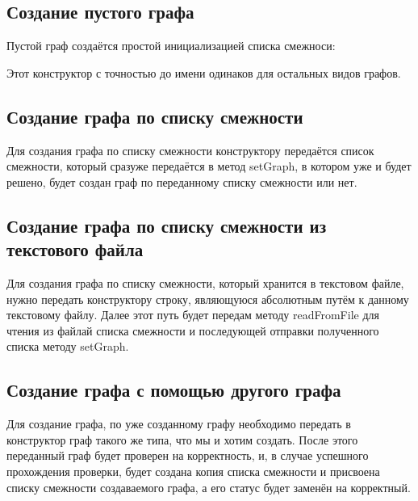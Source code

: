 \documentclass[bachelor, och, pract]{SCWorks}
\begin{document}
\subsection{Создание пустого графа}

Пустой граф создаётся простой инициализацией списка смежноси:
\bigskip


\bigskip

Этот конструктор с точностью до имени одинаков для остальных
видов графов.

\subsection{Создание графа по списку смежности}

Для создания графа по списку смежности конструктору передаётся
список смежности, который сразуже передаётся в метод setGraph,
в котором уже и будет решено, будет создан граф по переданному списку смежности
или нет.
\bigskip


\bigskip

\subsection{Создание графа по списку смежности из текстового файла}

Для создания графа по списку смежности, который хранится в текстовом файле,
нужно передать конструктору строку, являющуюся абсолютным путём к данному
текстовому файлу. Далее этот путь будет передам методу readFromFile для чтения
из файлай списка смежности и последующей отправки полученного списка методу
setGraph.
\bigskip


\bigskip

\subsection{Создание графа с помощью другого графа}

Для создание графа, по уже созданному графу необходимо передать
в конструктор граф такого же типа, что мы и хотим создать. После этого
переданный граф будет проверен на корректность, и, в случае успешного
прохождения проверки, будет создана копия списка смежности и присвоена
списку смежности создаваемого графа, а его статус будет заменён на корректный.
\bigskip


\bigskip
\end{document}
